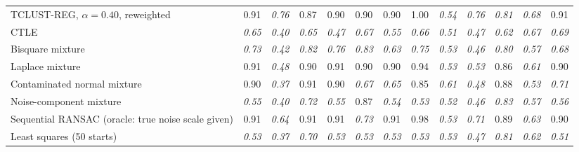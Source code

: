 \begin{table}[!tb]
{\begin{tabular}{lcccccccccccc}
TCLUST-REG, $\alpha=0.40$, reweighted & 0.91 & \textit{0.76} & 0.87 & 0.90 & 0.90 & 0.90 & 1.00 & \textit{0.54} & \textit{0.76} & \textit{0.81} & \textit{0.68} & 0.91 \\
\addlinespace
CTLE & \textit{0.65} & \textit{0.40} & \textit{0.65} & \textit{0.47} & \textit{0.67} & \textit{0.55} & \textit{0.66} & \textit{0.51} & \textit{0.47} & \textit{0.62} & \textit{0.67} & \textit{0.69} \\
Bisquare mixture & \textit{0.73} & \textit{0.42} & \textit{0.82} & \textit{0.76} & \textit{0.83} & \textit{0.63} & \textit{0.75} & \textit{0.53} & \textit{0.46} & \textit{0.80} & \textit{0.57} & \textit{0.68} \\
Laplace mixture & 0.91 & \textit{0.48} & 0.90 & 0.91 & 0.90 & 0.90 & 0.94 & \textit{0.53} & \textit{0.53} & 0.86 & \textit{0.61} & 0.90 \\
Contaminated normal mixture & 0.90 & \textit{0.37} & 0.91 & 0.90 & \textit{0.67} & \textit{0.65} & 0.85 & \textit{0.61} & \textit{0.48} & 0.88 & \textit{0.53} & \textit{0.71} \\
Noise-component mixture & \textit{0.55} & \textit{0.40} & \textit{0.72} & \textit{0.55} & 0.87 & \textit{0.54} & \textit{0.53} & \textit{0.52} & \textit{0.46} & \textit{0.83} & \textit{0.57} & \textit{0.56} \\
Sequential RANSAC (oracle: true noise scale given) & 0.91 & \textit{0.64} & 0.91 & 0.91 & \textit{0.73} & 0.91 & 0.98 & \textit{0.53} & \textit{0.71} & 0.89 & \textit{0.63} & 0.90 \\
Least squares (50 starts) & \textit{0.53} & \textit{0.37} & \textit{0.70} & \textit{0.53} & \textit{0.53} & \textit{0.53} & \textit{0.53} & \textit{0.53} & \textit{0.47} & \textit{0.81} & \textit{0.62} & \textit{0.51} \\
\bottomrule
\end{tabular}}
\end{table}
